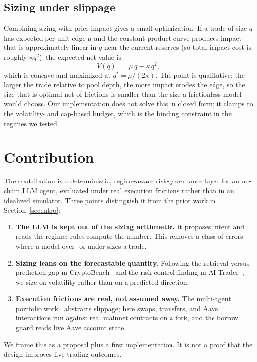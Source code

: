 \documentclass[11pt]{article}
\begin{document}
\subsection{Sizing under slippage}
Combining sizing with price impact gives a small optimization. If a trade of size $q$ has expected
per-unit edge $\mu$ and the constant-product curve produces impact that is approximately linear in $q$
near the current reserves (so total impact cost is roughly $\kappa q^2$), the expected net value is
\begin{equation}
V(q) \;=\; \mu\,q - \kappa\,q^{2},
\end{equation}
which is concave and maximized at $q^{*} = \mu/(2\kappa)$. The point is qualitative: the larger the
trade relative to pool depth, the more impact erodes the edge, so the size that is optimal net of
frictions is smaller than the size a frictionless model would choose. Our implementation does not
solve this in closed form; it clamps to the volatility- and cap-based budget, which is the binding
constraint in the regimes we tested.

\section{Contribution}\label{sec:contribution}
The contribution is a deterministic, regime-aware risk-governance layer for an on-chain LLM agent,
evaluated under real execution frictions rather than in an idealized simulator. Three points
distinguish it from the prior work in Section~\ref{sec:intro}:
\begin{enumerate}
  \item \textbf{The LLM is kept out of the sizing arithmetic.} It proposes intent and reads the
        regime; rules compute the number. This removes a class of errors where a model over- or
        under-sizes a trade.
  \item \textbf{Sizing leans on the forecastable quantity.} Following the retrieval-versus-prediction
        gap in CryptoBench~\cite{cryptobench} and the risk-control finding in AI-Trader~\cite{aitrader},
        we size on volatility rather than on a predicted direction.
  \item \textbf{Execution frictions are real, not assumed away.} The multi-agent portfolio
        work~\cite{mas} abstracts slippage; here swaps, transfers, and Aave interactions run against
        real mainnet contracts on a fork, and the borrow guard reads live Aave account state.
\end{enumerate}
We frame this as a proposal plus a first implementation. It is not a proof that the design improves
live trading outcomes.
\end{document}
